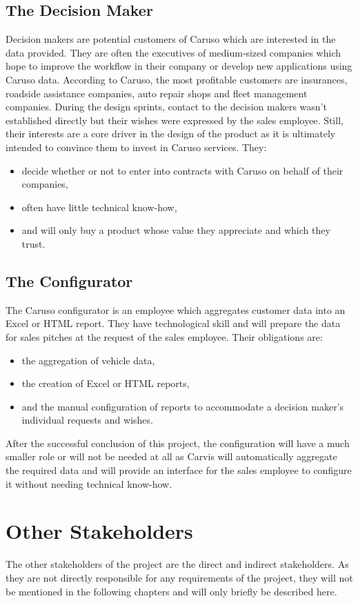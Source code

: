 \subsection{The Decision Maker}
Decision makers are potential customers of Caruso which are interested in the data provided. They are often the executives of medium-sized companies which hope to improve the workflow in their company or develop new applications using Caruso data. According to Caruso, the most profitable customers are insurances, roadside assistance companies, auto repair shops and fleet management companies. During the design sprints, contact to the decision makers wasn't established directly but their wishes were expressed by the sales employee. Still, their interests are a core driver in the design of the product as it is ultimately intended to convince them to invest in Caruso services. They:
\begin{itemize}
  \item decide whether or not to enter into contracts with Caruso on behalf of their companies,
  \item often have little technical know-how,
  \item and will only buy a product whose value they appreciate and which they trust.
\end{itemize}

\subsection{The Configurator}
The Caruso configurator is an employee which aggregates customer data into an Excel or HTML report. They have technological skill and will prepare the data for sales pitches at the request of the sales employee. Their obligations are:
\begin{itemize}
  \item the aggregation of vehicle data,
  \item the creation of Excel or HTML reports,
  \item and the manual configuration of reports to accommodate a decision maker's individual requests and wishes.
\end{itemize}
After the successful conclusion of this project, the configuration will have a much smaller role or will not be needed at all as Carvis will automatically aggregate the required data and will provide an interface for the sales employee to configure it without needing technical know-how.

\section{Other Stakeholders}
The other stakeholders of the project are the direct and indirect stakeholders. As they are not directly responsible for any requirements of the project, they will not be mentioned in the following chapters and will only briefly be described here.

